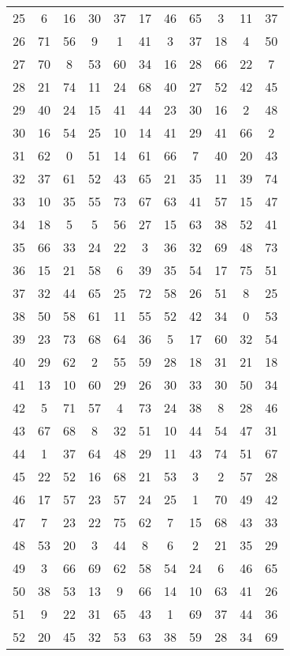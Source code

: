 \begin{table}
\begin{tabular}{c c c c c c c c c c c }
25 & 6 & 16 & 30 & 37 & 17 & 46 & 65 & 3 & 11 & 37 \\
26 & 71 & 56 & 9 & 1 & 41 & 3 & 37 & 18 & 4 & 50 \\
27 & 70 & 8 & 53 & 60 & 34 & 16 & 28 & 66 & 22 & 7 \\
28 & 21 & 74 & 11 & 24 & 68 & 40 & 27 & 52 & 42 & 45 \\
29 & 40 & 24 & 15 & 41 & 44 & 23 & 30 & 16 & 2 & 48 \\
30 & 16 & 54 & 25 & 10 & 14 & 41 & 29 & 41 & 66 & 2 \\
31 & 62 & 0 & 51 & 14 & 61 & 66 & 7 & 40 & 20 & 43 \\
32 & 37 & 61 & 52 & 43 & 65 & 21 & 35 & 11 & 39 & 74 \\
33 & 10 & 35 & 55 & 73 & 67 & 63 & 41 & 57 & 15 & 47 \\
34 & 18 & 5 & 5 & 56 & 27 & 15 & 63 & 38 & 52 & 41 \\
35 & 66 & 33 & 24 & 22 & 3 & 36 & 32 & 69 & 48 & 73 \\
36 & 15 & 21 & 58 & 6 & 39 & 35 & 54 & 17 & 75 & 51 \\
37 & 32 & 44 & 65 & 25 & 72 & 58 & 26 & 51 & 8 & 25 \\
38 & 50 & 58 & 61 & 11 & 55 & 52 & 42 & 34 & 0 & 53 \\
39 & 23 & 73 & 68 & 64 & 36 & 5 & 17 & 60 & 32 & 54 \\
40 & 29 & 62 & 2 & 55 & 59 & 28 & 18 & 31 & 21 & 18 \\
41 & 13 & 10 & 60 & 29 & 26 & 30 & 33 & 30 & 50 & 34 \\
42 & 5 & 71 & 57 & 4 & 73 & 24 & 38 & 8 & 28 & 46 \\
43 & 67 & 68 & 8 & 32 & 51 & 10 & 44 & 54 & 47 & 31 \\
44 & 1 & 37 & 64 & 48 & 29 & 11 & 43 & 74 & 51 & 67 \\
45 & 22 & 52 & 16 & 68 & 21 & 53 & 3 & 2 & 57 & 28 \\
46 & 17 & 57 & 23 & 57 & 24 & 25 & 1 & 70 & 49 & 42 \\
47 & 7 & 23 & 22 & 75 & 62 & 7 & 15 & 68 & 43 & 33 \\
48 & 53 & 20 & 3 & 44 & 8 & 6 & 2 & 21 & 35 & 29 \\
49 & 3 & 66 & 69 & 62 & 58 & 54 & 24 & 6 & 46 & 65 \\
50 & 38 & 53 & 13 & 9 & 66 & 14 & 10 & 63 & 41 & 26 \\
51 & 9 & 22 & 31 & 65 & 43 & 1 & 69 & 37 & 44 & 36 \\
52 & 20 & 45 & 32 & 53 & 63 & 38 & 59 & 28 & 34 & 69 \\

\end{tabular}
\end{table}
